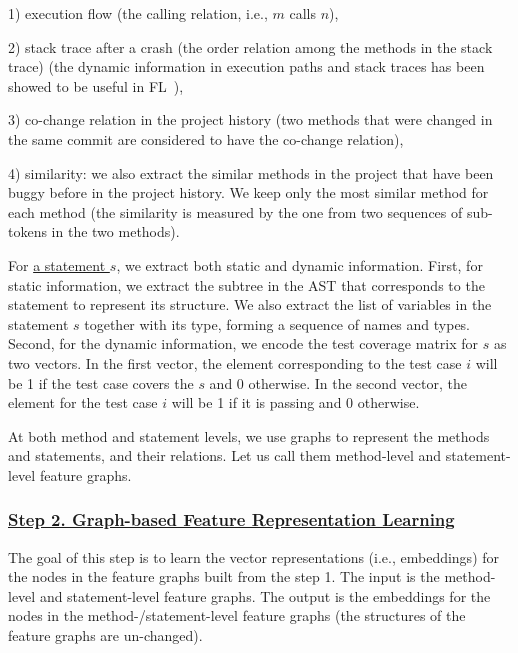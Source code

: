 1) execution flow (the calling relation, i.e., $m$ calls $n$),

2) stack trace after a crash (the order relation among the methods in
the stack trace) (the dynamic information in execution paths and stack
traces has been showed to be useful in FL~\cite{icse21-fl,DeepFL}),

3) co-change relation in the project history (two methods that were
changed in the same commit are considered to have the co-change
relation),

4) similarity: we also extract the similar methods in the project that
have been buggy before in the project history. We keep only the most
similar method for each method (the similarity is measured by the one
from two sequences of sub-tokens in the two methods).

For \underline{a statement $s$}, we extract both static and dynamic
information. First, for static information, we extract the subtree in
the AST that corresponds to the statement to represent its
structure. We also extract the list of variables in the statement $s$
together with its type, forming a sequence of names and types. Second,
for the dynamic information, we encode the test coverage matrix for
$s$ as two vectors. In the first vector, the element corresponding to
the test case $i$ will be 1 if the test case covers the $s$ and 0
otherwise. In the second vector, the element for the test case $i$
will be 1 if it is passing and 0 otherwise.

At both method and statement levels, we use graphs to represent
the methods and statements, and their relations. Let us call
them method-level and statement-level feature graphs.

\subsubsection*{\underline{Step 2. Graph-based Feature Representation Learning}}

The goal of this step is to learn the vector representations
(i.e., embeddings) for the nodes in the feature graphs built from the
step 1. The input is the method-level and statement-level feature
graphs. The output is the embeddings for the nodes in the
method-/statement-level feature graphs (the structures of the feature
graphs are un-changed).


